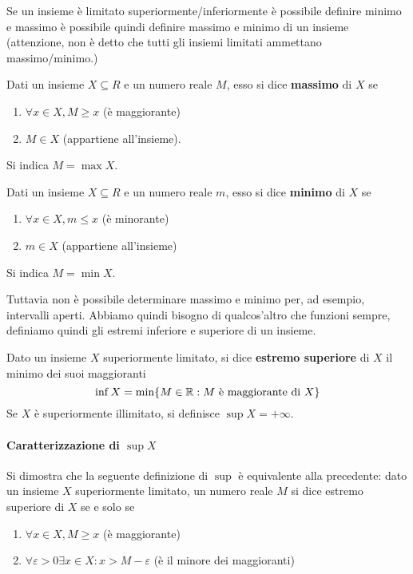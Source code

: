 \documentclass{book}     %
\begin{document}
Se un insieme è limitato superiormente/inferiormente è possibile definire minimo e massimo è possibile quindi definire massimo e minimo di un insieme (attenzione, non è detto che tutti gli insiemi limitati ammettano massimo/minimo.)
\begin{boxdef}[Massimo]
    Dati un insieme $X\subseteq R$ e un numero reale $M$, esso si dice \textbf{massimo} di $X$ se 
    \begin{enumerate}[label={\roman*)}]
        \item $\forall x\in X, M\geq x $ (è maggiorante)
        \item $M\in X$ (appartiene all'insieme).
    \end{enumerate}
    Si indica $M=\max X$.
\end{boxdef}
\begin{boxdef}[Minimo]
    Dati un insieme $X\subseteq R$ e un numero reale $m$, esso si dice \textbf{minimo} di $X$ se 
    \begin{enumerate}[label={\roman*)}]
        \item $\forall x\in X, m\leq x $ (è minorante)
        \item $m\in X$ (appartiene all'insieme)
    \end{enumerate}
    Si indica $M=\min X$.
\end{boxdef}
Tuttavia non è possibile determinare massimo e minimo per, ad esempio, intervalli aperti. Abbiamo quindi bisogno di qualcos'altro che funzioni sempre, definiamo quindi gli estremi inferiore e superiore di un insieme.

\begin{boxdef}
    Dato un insieme $X$ superiormente limitato, si dice \textbf{estremo superiore} di $X$ il minimo dei suoi maggioranti
    \[\inf X = \min\{M\in \mathbb{R} : M \text{ è maggiorante di }X\}\]
    Se $X$ è superiormente illimitato, si definisce $\sup X = +\infty$.
\end{boxdef}
\paragraph{Caratterizzazione di $\sup X$}
Si dimostra che la seguente definizione di $\sup$ è equivalente alla precedente: dato un insieme $X$ superiormente limitato, un numero reale $M$ si dice estremo superiore di $X$ se e solo se 
\begin{enumerate}[label={\roman*)}]
    \item $\forall x\in X, M\geq x $ (è maggiorante)
    \item $\forall \varepsilon >0 \exists x\in X: x>M-\varepsilon$ (è il minore dei maggioranti)
\end{enumerate}
\end{document}
